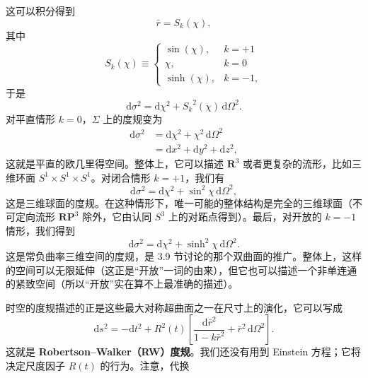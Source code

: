 这可以积分得到
\begin{equation*}
\bar{r} = S_k(\chi),
\tag{8.32}
\end{equation*}
其中
\begin{equation*}
S_k(\chi) \equiv
\begin{cases}
\sin(\chi), & k = +1\\
\chi, & k = 0\\
\sinh(\chi), & k = -1,
\end{cases}
\tag{8.33}
\end{equation*}
于是
\begin{equation*}
\mathrm{d}\sigma^2 = \mathrm{d}\chi^2 + {S_k}^2(\chi)\,\mathrm{d}\Omega^2.
\tag{8.34}
\end{equation*}
对平直情形 $k=0$，$\Sigma$ 上的度规变为
\begin{equation*}
\begin{aligned}
\mathrm{d}\sigma^2 &= \mathrm{d}\chi^2 + \chi^2\,\mathrm{d}\Omega^2\\
&= \mathrm{d}x^2 + \mathrm{d}y^2 + \mathrm{d}z^2,
\end{aligned}
\tag{8.35}
\end{equation*}
这就是平直的欧几里得空间。整体上，它可以描述 $\mathbf{R}^3$ 或者更复杂的流形，比如三维环面 $S^1\times S^1\times S^1$。对闭合情形 $k=+1$，我们有
\begin{equation*}
\mathrm{d}\sigma^2 = \mathrm{d}\chi^2 + \sin^2\chi\,\mathrm{d}\Omega^2,
\tag{8.36}
\end{equation*}
这是三维球面的度规。在这种情形下，唯一可能的整体结构是完全的三维球面（不可定向流形 $\mathbf{RP}^3$ 除外，它由认同 $S^3$ 上的对跖点得到）。最后，对开放的 $k=-1$ 情形，我们得到
\begin{equation*}
\mathrm{d}\sigma^2 = \mathrm{d}\chi^2 + \sinh^2\chi\,\mathrm{d}\Omega^2.
\tag{8.37}
\end{equation*}
这是常负曲率三维空间的度规，是 3.9 节讨论的那个双曲面的推广。整体上，这样的空间可以无限延伸（这正是“开放”一词的由来），但它也可以描述一个非单连通的紧致空间（所以“开放”实在算不上最准确的描述）。

时空的度规描述的正是这些最大对称超曲面之一在尺寸上的演化，它可以写成
\begin{equation*}
\mathrm{d}s^2 = -\mathrm{d}t^2 + R^2(t)\left[\frac{\mathrm{d}\bar{r}^2}{1-k\bar{r}^2} + \bar{r}^2\,\mathrm{d}\Omega^2\right].
\tag{8.38}
\end{equation*}
这就是 \textbf{Robertson–Walker（RW）度规}。我们还没有用到 Einstein 方程；它将决定尺度因子 $R(t)$ 的行为。注意，代换


